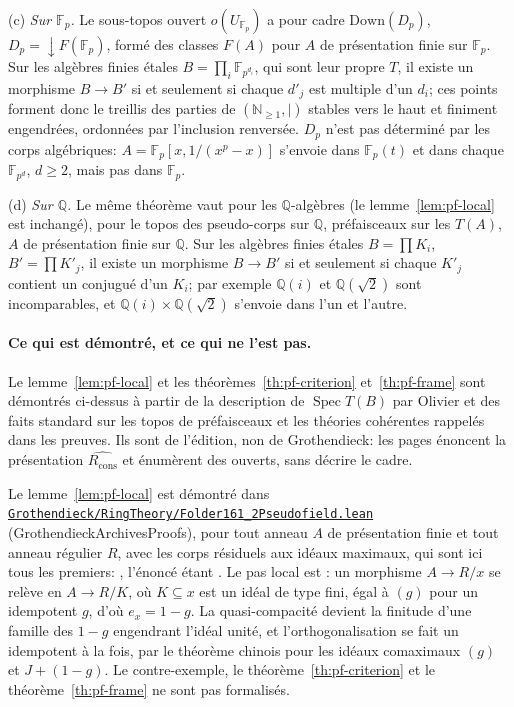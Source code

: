 (c) \emph{Sur $\mathbb F_p$.} Le sous-topos ouvert $o(U_{\mathbb F_p})$ a pour cadre $\mathrm{Down}(D_p)$, $D_p = {\downarrow}F(\mathbb F_p)$, formé des classes $F(A)$ pour $A$ de présentation finie sur $\mathbb F_p$. Sur les algèbres finies étales $B = \prod_i\mathbb F_{p^{d_i}}$, qui sont leur propre $T$, il existe un morphisme $B\to B'$ si et seulement si chaque $d'_j$ est multiple d'un $d_i$; ces points forment donc le treillis des parties de $(\mathbb N_{\ge1},\mid)$ stables vers le haut et finiment engendrées, ordonnées par l'inclusion renversée. $D_p$ n'est pas déterminé par les corps algébriques: $A = \mathbb F_p[x,1/(x^p-x)]$ s'envoie dans $\mathbb F_p(t)$ et dans chaque $\mathbb F_{p^d}$, $d\ge2$, mais pas dans $\mathbb F_p$.

(d) \emph{Sur $\mathbb Q$.} Le même théorème vaut pour les $\mathbb Q$-algèbres (le lemme~\ref{lem:pf-local} est inchangé), pour le topos des pseudo-corps sur $\mathbb Q$, préfaisceaux sur les $T(A)$, $A$ de présentation finie sur $\mathbb Q$. Sur les algèbres finies étales $B = \prod K_i$, $B' = \prod K'_j$, il existe un morphisme $B\to B'$ si et seulement si chaque $K'_j$ contient un conjugué d'un $K_i$; par exemple $\mathbb Q(i)$ et $\mathbb Q(\sqrt2)$ sont incomparables, et $\mathbb Q(i)\times\mathbb Q(\sqrt2)$ s'envoie dans l'un et l'autre.

\paragraph{Ce qui est démontré, et ce qui ne l'est pas.} Le lemme~\ref{lem:pf-local} et les théorèmes~\ref{th:pf-criterion} et~\ref{th:pf-frame} sont démontrés ci-dessus à partir de la description de $\operatorname{Spec}T(B)$ par Olivier et des faits standard sur les topos de préfaisceaux et les théories cohérentes rappelés dans les preuves. Ils sont de l'édition, non de Grothendieck: les pages énoncent la présentation $\widehat{R_{\mathrm{cons}}}$ et énumèrent des ouverts, sans décrire le cadre.

\leanentry{} Le lemme~\ref{lem:pf-local} est démontré dans \href{https://github.com/Commutator-IO/GrothendieckArchivesProofs/blob/main/Grothendieck/RingTheory/Folder161_2Pseudofield.lean}{\nolinkurl{Grothendieck/RingTheory/Folder161\_2Pseudofield.lean}} (GrothendieckArchivesProofs), pour tout anneau $A$ de présentation finie et tout anneau régulier $R$, avec les corps résiduels aux idéaux maximaux, qui sont ici tous les premiers: , l'énoncé étant . Le pas local est : un morphisme $A\to R/x$ se relève en $A\to R/K$, où $K\subseteq x$ est un idéal de type fini, égal à $(g)$ pour un idempotent $g$, d'où $e_x = 1-g$. La quasi-compacité devient la finitude d'une famille des $1-g$ engendrant l'idéal unité, et l'orthogonalisation se fait un idempotent à la fois, par le théorème chinois pour les idéaux comaximaux $(g)$ et $J+(1-g)$. Le contre-exemple, le théorème~\ref{th:pf-criterion} et le théorème~\ref{th:pf-frame} ne sont pas formalisés.

